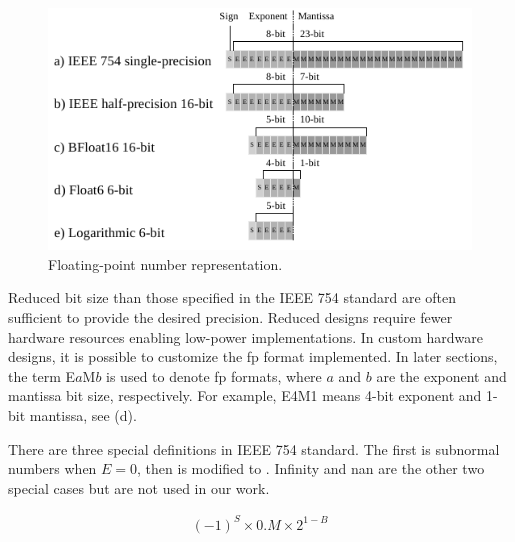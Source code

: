 \begin{figure}[b!]
	\centering
	\includegraphics[width=0.5\columnwidth]{./chapters/cnn_accelerator/figures/power_breakdown/floating_point.pdf}
	\caption{Floating-point number representation.}
	\label{fig:floating}
\end{figure}

Reduced bit size than those specified in the IEEE 754 standard are often sufficient to provide the desired precision. Reduced designs require fewer hardware resources enabling low-power implementations. In custom hardware designs, it is possible to customize the \gls{fp} format implemented. In later sections, the term E$a$M$b$ is used to denote \gls{fp} formats, where $a$ and $b$ are the exponent and mantissa bit size, respectively. For example, E4M1 means 4-bit exponent and 1-bit mantissa, see (d).

There are three special definitions in IEEE 754 standard. The first is subnormal numbers when $E=0$, then  is modified to . Infinity and \gls{nan} are the other two special cases but are not used in our work.

\begin{eqnarray} \label{eq:float_subnorm}
(-1)^{S} \times 0.M \times 2^{1-B}
\end{eqnarray}